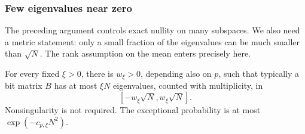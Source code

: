 \subsubsection{Few eigenvalues near zero}

The preceding argument controls exact nullity on many subspaces. We
also need a metric statement: only a small fraction of the eigenvalues
can be much smaller than \(\sqrt N\). The rank assumption on the mean
enters precisely here.

\begin{proposition}\label{prop:small-spectrum}
For every fixed \(\xi>0\), there is \(w_\xi>0\), depending also on
\(p\), such that typically a bit matrix \(B\) has at most \(\xi N\)
eigenvalues, counted with multiplicity, in
\[
 [-w_\xi\sqrt N,w_\xi\sqrt N].
\]
Nonsingularity is not required. The exceptional probability is at most
\(\exp(-c_{p,\xi}N^2)\).
\end{proposition}


